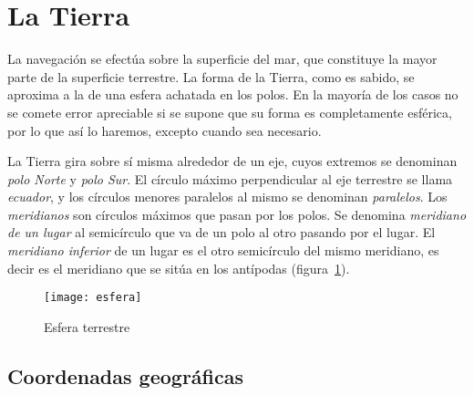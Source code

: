 \section{La Tierra}




La navegación se efectúa sobre la superficie del mar, que constituye la mayor parte de la superficie terrestre. La forma de la Tierra, como es sabido, se aproxima a la de una esfera achatada en los polos. En la mayoría de los casos no se comete error apreciable si se supone que su forma es completamente esférica, por lo que así lo haremos, excepto cuando sea necesario. 

La Tierra gira sobre sí misma alrededor de un eje, cuyos extremos se denominan \emph{polo Norte} y \emph{polo Sur}. El círculo máximo perpendicular al eje terrestre se llama \emph{ecuador}, y los círculos menores paralelos al mismo se denominan \emph{paralelos}. Los \emph{meridianos} son círculos máximos que pasan por los polos. Se denomina \emph{meridiano de un lugar } al semicírculo que va de un polo al otro pasando por el lugar. El \emph{meridiano inferior} de un lugar es el otro semicírculo del mismo meridiano, es decir es el meridiano que se sitúa en los antípodas (figura~\ref{fg:esfera}).

\begin{figure}[hbtp]
\begin{center}
\texttt{[image: esfera]}\\
\caption{Esfera terrestre}
\label{fg:esfera}
\end{center}
\end{figure}


\subsection{Coordenadas geográficas}


